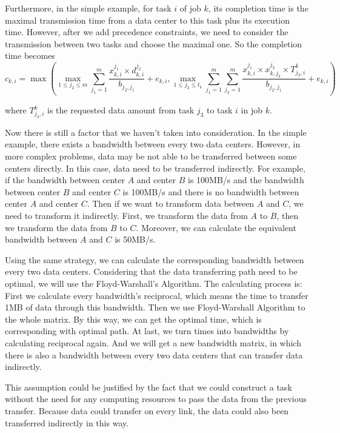 \documentclass{llncs}
\begin{document}
Furthermore, in the simple example, for task $i$ of job $k$, its completion time is the maximal transmission time from a data center to this task plus its execution time. However, after we add precedence constraints, we need to consider the transmission between two tasks and choose the maximal one. So the completion time becomes 
\begin{equation}\label{eq:taske}
    c_{k,i}=\max(\max\limits_{1\leq j_2\leq m}\sum_{j_1=1}^m\frac{x_{k,i}^{j_1}\times d_{k,i}^{j_2}}{b_{j_2,j_1}}+e_{k,i},\max\limits_{1\leq j_3\leq t_k}\sum_{j_1=1}^m\sum_{j_2=1}^m\frac{x_{k,i}^{j_1}\times x_{k,j_3}^{j_2}\times T_{j_3,i}^k}{b_{j_2,j_1}}+e_{k,i})
\end{equation}

where $T_{j_3,i}^k$ is the requested data amount from task $j_3$ to task $i$ in job $k$.

Now there is still a factor that we haven't taken into consideration. In the simple example, there exists a bandwidth between every two data centers. However, in more complex problems, data may be not able to be transferred between some centers directly. In this case, data need to be transferred indirectly. For example, if the bandwidth between center $A$ and center $B$ is 100MB/s and the bandwidth between center $B$ and center $C$ is 100MB/s and there is no bandwidth between center $A$ and center $C$. Then if we want to transform data between $A$ and $C$, we need to transform it indirectly. First, we transform the data from $A$ to $B$, then we transform the data from $B$ to $C$. Moreover, we can calculate the equivalent bandwidth between $A$ and $C$ is 50MB/s.

Using the same strategy, we can calculate the corresponding bandwidth between every two data centers. Considering that the data transferring path need to be optimal, we will use the Floyd-Warshall's Algorithm. The calculating process is: First we calculate every bandwidth's reciprocal, which means the time to transfer 1MB of data through this bandwidth. Then we use Floyd-Warshall Algorithm to the whole matrix. By this way, we can get the optimal time, which is corresponding with optimal path. At last, we turn times into bandwidths by calculating reciprocal again. And we will get a new bandwidth matrix, in which there is also a bandwidth between every two data centers that can transfer data indirectly.

This assumption could be justified by the fact that we could construct a  task without the need for any computing resources to pass the data from the previous transfer. Because data could transfer on every link, the data could also been transferred indirectly in this way.
\end{document}
